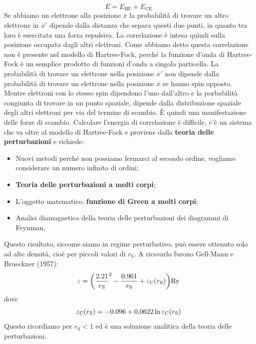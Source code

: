 \begin{equation*}
    E=E_{\text{HF}}+E_{\text{CE}}
\end{equation*}
Se abbiamo un elettrone alla posizione $\overline x$ la probabilità di trovare un altro elettrone in $\overline{x}'$ dipende dalla distanza che separa questi due punti, in quanto tra loro è esercitata una forza repulsiva. La correlazione è intesa quindi sulla posizione occupata dagli altri elettroni. Come abbiamo detto questa correlazione non è presente nel modello di Hartree-Fock, perché la funzione d'onda di Hartree-Fock è un semplice prodotto di funzioni d'onda a singola particella. La probabilità di trovare un elettrone nella posizione $\overline{x}'$ non dipende dalla probabilità di trovare un elettrone nella posizione $\overline x$ se hanno spin opposto. Mentre elettroni con lo stesso spin dipendono l'uno dall'altro e la porbabilità congiunta di trovare in un punto spaziale, dipende dalla distribuzione spaziale degli altri elettroni per via del termine di scambio. È quindi una manifestazione delle forze di scambio.
Calcolare l'energia di correlazione è difficile, c'è un sistema che va oltre al modello di Hartree-Fock e proviene dalla \textbf{teoria delle perturbazioni} e richiede:
\begin{itemize}
    \item Nuovi metodi perché non possiamo fermarci al secondo ordine, vogliamo considerare un numero infinito di ordini;
    \item \textbf{Teoria delle perturbazioni a molti corpi};
    \item L'oggetto matematico: \textbf{funzione di Green a molti corpi}; 
    \item Analisi diamagnetica della teoria delle perturbazioni dei diagrammi di Feynman,
\end{itemize}
Questo risultato, siccome siamo in regime perturbativo, può essere ottenuto solo ad alte densità, cioè per piccoli valori di $r_\text{S}$. A ricavarlo furono Gell-Mann e Brueckner (1957):
\begin{equation*}
    \varepsilon=\bigg(\frac{2.21}{r_\text{S}}^2-\frac{0.961}{r_\text{S}}+\varepsilon_{\text C}(r_\text{S})\bigg)\text{Ry}
\end{equation*}
dove
\begin{equation*}
    \varepsilon_{\text C}(r_\text{S})=-0.096+0.0622\ln{\varepsilon_{\text C}(r_\text{S})}
\end{equation*}
Questo ricordiamo per $r_\text{S}<1$ ed è una soluzione analitica della teoria delle perturbazioni.

